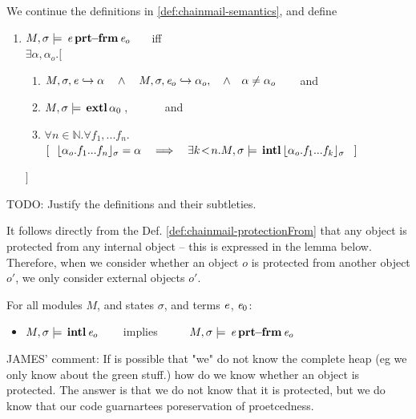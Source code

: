 \begin{definition} 
\label{def:chainmail-protectionFrom}
We continue the definitions in \ref{def:chainmail-semantics}, and define   
\begin{enumerate}
\item
\label{cProtected}
$M , \sigma \models {\ensuremath{\, {\mathit{e}}\, \mathbf{prt\!\!-\!\!frm}}\, {\mathit{e}_{o}}}$  \ \ \ iff \\
  $\exists \alpha, \alpha_{o}. [\ $
\begin{enumerate}
\item $\eval{M}{\sigma}{{\re}}{\alpha} \ \ \ \wedge\ \ \  \eval{M}{\sigma}{{\re_{o}}}{\alpha_{o}},  \ \ \ \wedge\ \ \  \alpha \neq \alpha_{o}$\ \ \ \  and  
\item $M , \sigma \models {\ensuremath{\, \mathbf{extl}}\, \alpha_0\, }$, \ \ \ \ \ \ and  
\item 
$\forall n\in\mathbb{N}. \forall f_1,...f_n.$\\
$
[\ \ \interpret{\sigma}{\alpha_{o}.f_1...f_n}=\alpha \ \ \  \Longrightarrow \ \ \ \exists k\!<\!n. \satisfiesA{M} {\sigma} {\internal{{\interpret{\sigma}{\alpha_{o}.f_1...f_k}}}} \ \ ]$
\end{enumerate}
\strut \hspace{.4cm} $]$
\end{enumerate}
\end{definition}

TODO: Justify the definitions and their subtleties. 

It follows directly from the Def. \ref{def:chainmail-protectionFrom} that any object is protected from any internal object --
this is expressed in the lemma below. Therefore, when we consider whether an object $o$ is protected from another object $o'$,  we only consider external objects $o'$.

\begin{lemma}
\label{lemma:internalProtects}
For all modules $M$, and states $\sigma$, and terms $\mathit{e}$, $\mathit{e}_0$:
\begin{itemize}
\item
$ M , \sigma \models {\ensuremath{\, \mathbf{intl}}\, \mathit{e}_o\, }$\ \ \ \ implies \ \ \ \ \  $M , \sigma \models {\ensuremath{\, {\mathit{e}}\, \mathbf{prt\!\!-\!\!frm}}\, {\mathit{e}_{o}}}$
\end{itemize}

\end{lemma}



JAMES' comment: If is possible that "we" do not know the complete heap (eg we only know about the green stuff.) how do we know whether an object is protected. The answer is that we do not know that it is protected, but we do know that our code guarnartees poreservation of proetcedness.

